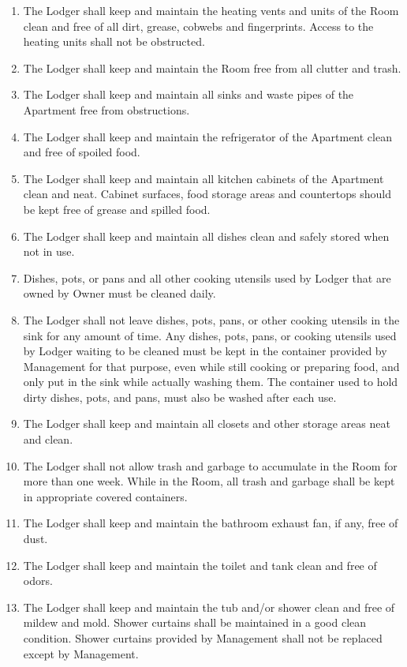 \documentclass[12pt,letterpaper]{article}
\newcommand{\management}{Management}
\newcommand{\apt}{Apartment}
\newcommand{\room}{Room}
\newcommand{\lodger}{Lodger}
\begin{document}
\begin{enumerate}
	\item The \lodger{} shall keep and maintain the heating vents and units of the \room{} clean and free of all dirt, grease, cobwebs and fingerprints. Access to the heating units shall not be obstructed. 
	\item The \lodger{} shall keep and maintain the \room{} free from all clutter and trash. 
	\item The \lodger{} shall keep and maintain all sinks and waste pipes of the \apt{} free from obstructions. 
	\item The \lodger{} shall keep and maintain the refrigerator of the \apt{} clean and free of spoiled food.
	\item The \lodger{} shall keep and maintain all kitchen cabinets of the \apt{} clean and neat. Cabinet surfaces, food storage areas and countertops should be kept free of grease and spilled food. 
	\item The \lodger{} shall keep and maintain all dishes clean and safely stored when not in use. 
	\item Dishes, pots, or pans and all other cooking utensils used by \lodger{} that are owned by Owner must be cleaned daily.
	\item The \lodger{} shall not leave dishes, pots, pans, or other cooking utensils in the sink for any amount of time. Any dishes, pots, pans, or cooking utensils used by \lodger{} waiting to be cleaned must be kept in the container provided by \management{} for that purpose, even while still cooking or preparing food, and only put in the sink while actually washing them. The container used to hold dirty dishes, pots, and pans, must also be washed after each use.
	\item The \lodger{} shall keep and maintain all closets and other storage areas neat and clean. 
	\item The \lodger{} shall not allow trash and garbage to accumulate in the \room{} for more than one week. While in the \room{}, all trash and garbage shall be kept in appropriate covered containers. 
	\item The \lodger{} shall keep and maintain the bathroom exhaust fan, if any, free of dust. 
	\item The \lodger{} shall keep and maintain the toilet and tank clean and free of odors. 
	\item The \lodger{} shall keep and maintain the tub and/or shower clean and free of mildew and mold. Shower curtains shall be maintained in a good clean condition. Shower curtains provided by \management{} shall not be replaced except by \management{}.
\end{enumerate}
\end{document}
